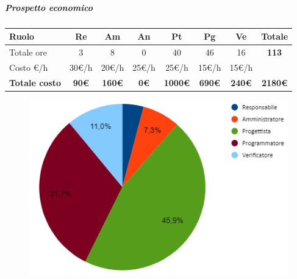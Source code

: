 \subparagraph{Prospetto economico}
\begin{center}
	\renewcommand{\arraystretch}{1.8} %
	\begin{tabular}{ |m{10em}|c|c|c|c|c|c|c| }
	\hline
	\textbf{Ruolo} & \textbf{Re} & \textbf{Am} &  \textbf{An} &  \textbf{Pt} &  \textbf{Pg} &  \textbf{Ve} &  \textbf{Totale}\\
    \hline
    Totale ore & 3 & 8 & 0 & 40 & 46 & 16 & \textbf{113}\\
    \hline
    Costo \euro/h & 30\euro/h & 20\euro/h & 25\euro/h & 25\euro/h & 15\euro/h & 15\euro/h & \\
    \hline
    \textbf{Totale costo} & \textbf{90\euro} & \textbf{160\euro} &  \textbf{0\euro} &  \textbf{1000\euro} &  \textbf{690\euro} &  \textbf{240\euro} &  \textbf{2180\euro}\\
    \hline
	\end{tabular}

    \begin{figure}[H]
       \centering\includegraphics{images/preventivo/PB-incremento1-costo.png}
    \end{figure}
\end{center}



